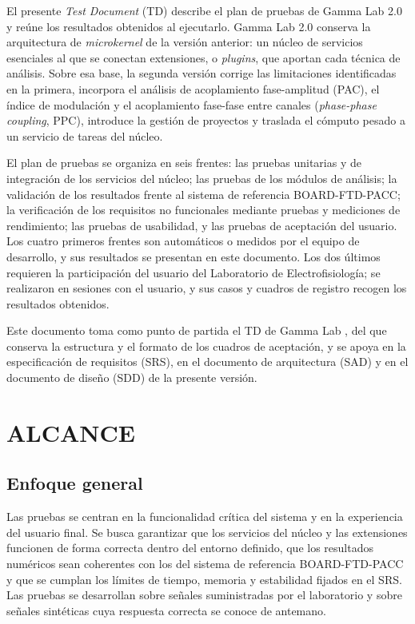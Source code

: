 \documentclass[12pt,letterpaper,oneside]{article}
\DeclareRobustCommand{\_}{\textunderscore\allowbreak}
\newcommand{\capitulo}[1]{\clearpage\section{#1}}
\begin{document}
El presente \textit{Test Document} (TD) describe el plan de pruebas de Gamma Lab 2.0 y reúne los resultados obtenidos al ejecutarlo. Gamma Lab 2.0 conserva la arquitectura de \textit{microkernel} de la versión anterior: un núcleo de servicios esenciales al que se conectan extensiones, o \textit{plugins}, que aportan cada técnica de análisis. Sobre esa base, la segunda versión corrige las limitaciones identificadas en la primera, incorpora el análisis de acoplamiento fase-amplitud (PAC), el índice de modulación y el acoplamiento fase-fase entre canales (\textit{phase-phase coupling}, PPC), introduce la gestión de proyectos y traslada el cómputo pesado a un servicio de tareas del núcleo.

El plan de pruebas se organiza en seis frentes: las pruebas unitarias y de integración de los servicios del núcleo; las pruebas de los módulos de análisis; la validación de los resultados frente al sistema de referencia BOARD-FTD-PACC; la verificación de los requisitos no funcionales mediante pruebas y mediciones de rendimiento; las pruebas de usabilidad, y las pruebas de aceptación del usuario. Los cuatro primeros frentes son automáticos o medidos por el equipo de desarrollo, y sus resultados se presentan en este documento. Los dos últimos requieren la participación del usuario del Laboratorio de Electrofisiología; se realizaron en sesiones con el usuario, y sus casos y cuadros de registro recogen los resultados obtenidos.

Este documento toma como punto de partida el TD de Gamma Lab \cite{td2025}, del que conserva la estructura y el formato de los cuadros de aceptación, y se apoya en la especificación de requisitos (SRS), en el documento de arquitectura (SAD) y en el documento de diseño (SDD) de la presente versión.

\capitulo{ALCANCE}

\subsection{Enfoque general}
Las pruebas se centran en la funcionalidad crítica del sistema y en la experiencia del usuario final. Se busca garantizar que los servicios del núcleo y las extensiones funcionen de forma correcta dentro del entorno definido, que los resultados numéricos sean coherentes con los del sistema de referencia BOARD-FTD-PACC y que se cumplan los límites de tiempo, memoria y estabilidad fijados en el SRS. Las pruebas se desarrollan sobre señales suministradas por el laboratorio y sobre señales sintéticas cuya respuesta correcta se conoce de antemano.
\end{document}
